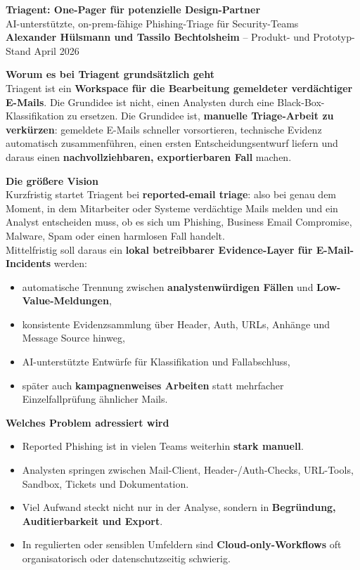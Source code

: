\documentclass[10pt,a4paper]{article}
\begin{document}
\begin{center}
{\Large \textbf{Triagent: One-Pager für potenzielle Design-Partner}}\\[0.15em]
{\large AI-unterstützte, on-prem-fähige Phishing-Triage für Security-Teams}\\[0.35em]
\textbf{Alexander Hülsmann und Tassilo Bechtolsheim} -- Produkt- und Prototyp-Stand April 2026
\end{center}
\small

\vspace{0.25em}
\noindent\textbf{Worum es bei Triagent grundsätzlich geht}\\
Triagent ist ein \textbf{Workspace für die Bearbeitung gemeldeter verdächtiger E-Mails}. Die Grundidee ist nicht, einen Analysten durch eine Black-Box-Klassifikation zu ersetzen. Die Grundidee ist, \textbf{manuelle Triage-Arbeit zu verkürzen}: gemeldete E-Mails schneller vorsortieren, technische Evidenz automatisch zusammenführen, einen ersten Entscheidungsentwurf liefern und daraus einen \textbf{nachvollziehbaren, exportierbaren Fall} machen.

\vspace{0.25em}
\noindent\textbf{Die größere Vision}\\
Kurzfristig startet Triagent bei \textbf{reported-email triage}: also bei genau dem Moment, in dem Mitarbeiter oder Systeme verdächtige Mails melden und ein Analyst entscheiden muss, ob es sich um Phishing, Business Email Compromise, Malware, Spam oder einen harmlosen Fall handelt.\\
Mittelfristig soll daraus ein \textbf{lokal betreibbarer Evidence-Layer für E-Mail-Incidents} werden:
\begin{itemize}
  \item automatische Trennung zwischen \textbf{analystenwürdigen Fällen} und \textbf{Low-Value-Meldungen},
  \item konsistente Evidenzsammlung über Header, Auth, URLs, Anhänge und Message Source hinweg,
  \item AI-unterstützte Entwürfe für Klassifikation und Fallabschluss,
  \item später auch \textbf{kampagnenweises Arbeiten} statt mehrfacher Einzelfallprüfung ähnlicher Mails.
\end{itemize}

\noindent\textbf{Welches Problem adressiert wird}
\begin{itemize}
  \item Reported Phishing ist in vielen Teams weiterhin \textbf{stark manuell}.
  \item Analysten springen zwischen Mail-Client, Header-/Auth-Checks, URL-Tools, Sandbox, Tickets und Dokumentation.
  \item Viel Aufwand steckt nicht nur in der Analyse, sondern in \textbf{Begründung, Auditierbarkeit und Export}.
  \item In regulierten oder sensiblen Umfeldern sind \textbf{Cloud-only-Workflows} oft organisatorisch oder datenschutzseitig schwierig.
\end{itemize}
\end{document}
